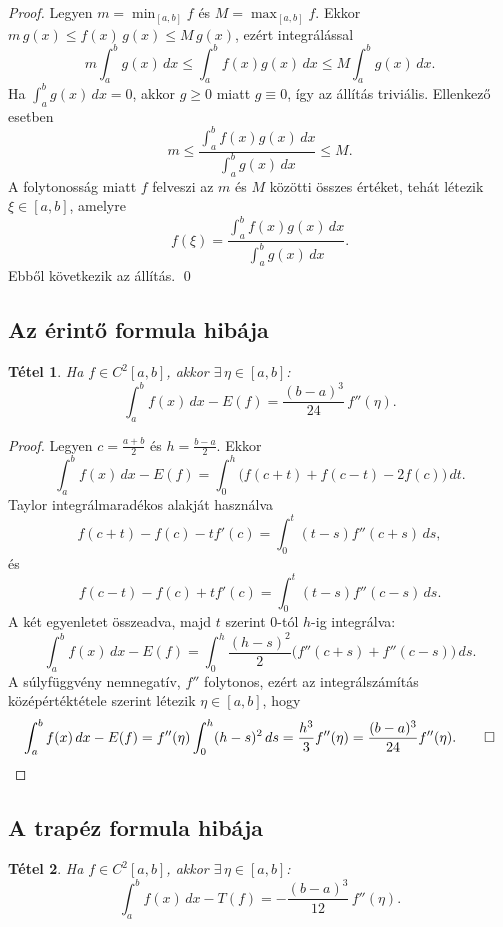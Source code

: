 \documentclass[a4paper,12pt]{article}
\theoremstyle{mydef}
\newtheorem{tetel}{Tétel}[section]
\begin{document}
\begin{proof}
Legyen $m = \min_{[a,b]} f$ és $M = \max_{[a,b]} f$. Ekkor
$m\,g(x) \le f(x)\,g(x) \le M\,g(x)$, ezért integrálással
\[
  m\int_a^b g(x)\,dx \le \int_a^b f(x)g(x)\,dx \le M\int_a^b g(x)\,dx.
\]
Ha $\int_a^b g(x)\,dx = 0$, akkor $g \ge 0$ miatt $g \equiv 0$, így az állítás triviális.
Ellenkező esetben
\[
  m \le \frac{\int_a^b f(x)g(x)\,dx}{\int_a^b g(x)\,dx} \le M.
\]
A folytonosság miatt $f$ felveszi az $m$ és $M$ közötti összes értéket, tehát létezik
$\xi \in [a,b]$, amelyre
\[
  f(\xi)=\frac{\int_a^b f(x)g(x)\,dx}{\int_a^b g(x)\,dx}.
\]
Ebből következik az állítás. \qed
\end{proof}

\subsection*{Az érintő formula hibája}

\begin{mdframed}[backgroundcolor=thmbg,linewidth=0pt,innertopmargin=8pt,innerbottommargin=8pt]
\begin{tetel}
\label{tetel:erintohiba}
Ha $f \in C^2[a,b]$, akkor $\exists\,\eta \in [a,b]$:
\[
  \int_a^b f(x)\,dx - E(f) = \frac{(b-a)^3}{24}\,f''(\eta).
\]
\end{tetel}
\end{mdframed}

\begin{proof}
Legyen $c = \tfrac{a+b}{2}$ és $h = \tfrac{b-a}{2}$. Ekkor
\[
  \int_a^b f(x)\,dx - E(f)
  = \int_0^h \bigl(f(c+t)+f(c-t)-2f(c)\bigr)\,dt.
\]
Taylor integrálmaradékos alakját használva
\[
  f(c+t)-f(c)-t f'(c)=\int_0^t (t-s)f''(c+s)\,ds,
\]
és
\[
  f(c-t)-f(c)+t f'(c)=\int_0^t (t-s)f''(c-s)\,ds.
\]
A két egyenletet összeadva, majd $t$ szerint $0$-tól $h$-ig integrálva:
\[
  \int_a^b f(x)\,dx - E(f)
  = \int_0^h \frac{(h-s)^2}{2}\bigl(f''(c+s)+f''(c-s)\bigr)\,ds.
\]
A súlyfüggvény nemnegatív, $f''$ folytonos, ezért az integrálszámítás középértéktétele
szerint létezik $\eta\in[a,b]$, hogy
\[
  \int_a^b f(x)\,dx - E(f)
  = f''(\eta)\int_0^h (h-s)^2\,ds
  = \frac{h^3}{3}f''(\eta)
  = \frac{(b-a)^3}{24}f''(\eta). \qed
\]
\end{proof}

\subsection*{A trapéz formula hibája}

\begin{mdframed}[backgroundcolor=thmbg,linewidth=0pt,innertopmargin=8pt,innerbottommargin=8pt]
\begin{tetel}
\label{tetel:trapezhiba}
Ha $f \in C^2[a,b]$, akkor $\exists\,\eta \in [a,b]$:
\[
  \int_a^b f(x)\,dx - T(f) = -\frac{(b-a)^3}{12}\,f''(\eta).
\]
\end{tetel}
\end{mdframed}
\end{document}
